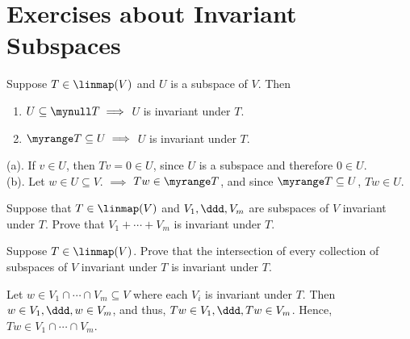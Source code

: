 \section*{Exercises about Invariant Subspaces}

\begin{xrcs}
  Suppose $T \in \linmap(V)$ and $U$ is a subspace of $V$. Then
  \begin{enumerate}
    \item $U \subseteq \mynull T \implies$ $U$ is invariant under $T$.
    \item $\myrange T \subseteq U \implies$ $U$ is invariant under $T$.
  \end{enumerate}

  \begin{xprf}
    { }(a). { }If $v \in U$, then $Tv = 0 \in U$, since $U$ is a subspace and therefore $0 \in U$. \\
    (b). { }Let $w \in U\subseteq V$. $\implies$ $Tw \in \myrange T$, and since $\myrange T \subseteq U$, $Tw \in U$.
  \end{xprf}

\end{xrcs}

\begin{xrcs}
  Suppose that $T \in \linmap (V)$ and $V_1, \ddd, V_m$ are subspaces of $V$ invariant under $T$.
  Prove that $V_1 + \cdots + V_m$ is invariant under $T$.

\end{xrcs}

\begin{xrcs}
  Suppose $T \in \linmap(V)$. Prove that the intersection of every collection of subspaces of $V$ invariant under $T$ is invariant under $T$.

  \begin{xprf}
    Let $w \in V_1 \cap \cdots \cap V_m \subseteq V$ where each $V_i$ is invariant under $T$. Then $w \in V_1, \ddd, w \in V_m$, and thus, $Tw \in V_1, \ddd, Tw \in V_m$. Hence, $Tw \in V_1 \cap \cdots \cap V_m$.
  \end{xprf}
\end{xrcs}

